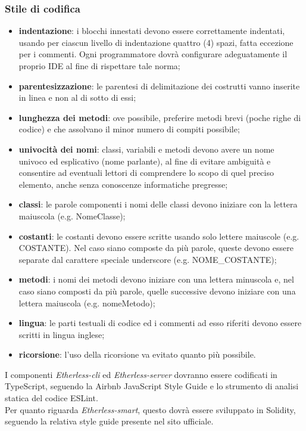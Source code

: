     	\subsubsection*{Stile di codifica}
   \begin{itemize}
         \item{\textbf{indentazione}: i blocchi innestati devono essere correttamente indentati, usando per ciascun livello di indentazione quattro (4) spazi, fatta eccezione per i commenti. Ogni programmatore dovrà configurare adeguatamente il proprio IDE al fine di rispettare tale norma;}
		\item{\textbf{parentesizzazione}: le parentesi di delimitazione dei costrutti vanno inserite in linea e non al di sotto di essi;}
		\item{\textbf{lunghezza dei metodi}: ove possibile, preferire metodi brevi (poche righe di codice) e che assolvano il minor numero di compiti possibile;}
		\item{\textbf{univocità dei nomi}: classi, variabili e metodi devono avere un nome univoco ed esplicativo (nome parlante), al fine di evitare ambiguità e consentire ad eventuali lettori di comprendere lo scopo di quel preciso elemento, anche senza conoscenze informatiche pregresse;}
		\item{\textbf{classi}: le parole componenti i nomi delle classi devono iniziare con la lettera maiuscola (e.g. NomeClasse);}
		\item{\textbf{costanti}: le costanti devono essere scritte usando solo lettere maiuscole (e.g. COSTANTE). Nel caso siano composte da più parole, queste devono essere separate dal carattere speciale underscore (e.g. NOME\_COSTANTE);}
		\item{\textbf{metodi}: i nomi dei metodi devono iniziare con una lettera minuscola e, nel caso 	siano composti da più parole, quelle successive devono iniziare con una lettera maiuscola (e.g. nomeMetodo);}
		\item{\textbf{lingua}: le parti testuali di codice ed i commenti ad esso riferiti devono essere scritti in lingua inglese;}
        \item{\textbf{ricorsione}: l'uso della ricorsione va evitato quanto più possibile.}
	\end{itemize}

	\noindent I componenti \textit{Etherless-cli} ed \textit{Etherless-server} dovranno essere codificati in TypeScript, seguendo la Airbnb JavaScript Style Guide e lo strumento di analisi statica del codice ESLint. \\
	Per quanto riguarda \textit{Etherless-smart}, questo dovrà essere sviluppato in Solidity, seguendo la relativa style guide presente nel sito ufficiale.

